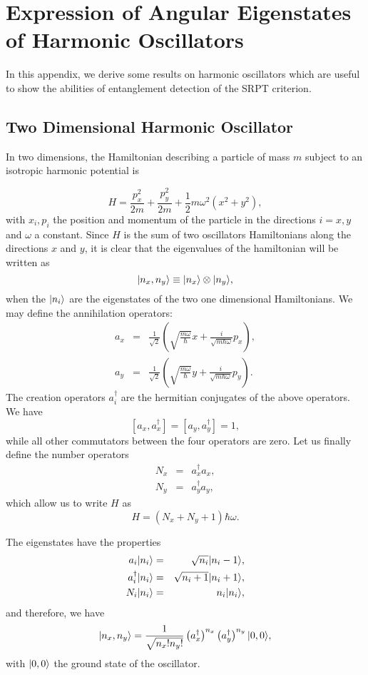 

\chapter{Expression of Angular Eigenstates of Harmonic Oscillators} \label{appA}

In this appendix, we derive some results on harmonic oscillators which are useful to show the abilities of entanglement detection of the SRPT criterion.

\section{Two Dimensional Harmonic Oscillator}

In two dimensions, the Hamiltonian describing a particle of mass $m$ subject to an isotropic harmonic potential is

\[ H =  \frac{p_x^2}{2m}+\frac{p_y^2}{2m} + \frac 1 2 m \omega^2 \left( x^2 + y^2 \right),\]
with $x_i, p_i$ the position and momentum of the particle in the directions $i=x,y$ and $\omega$ a constant. Since $H$ is the sum of two  oscillators Hamiltonians along the directions $x$ and $y$, it is clear that the eigenvalues of the hamiltonian will be written as
\[ | n_x, n_y \rangle \equiv | n_x \rangle \otimes | n_y \rangle, \]
when the $| n_i \rangle$ are the eigenstates of the two one dimensional Hamiltonians. We may define the annihilation operators:
\begin{eqnarray}
a_x &=& \frac{1}{\sqrt 2} \left( \sqrt{\frac{m\omega}{\hbar}} x + \frac{i}{\sqrt{m \hbar \omega}} p_x \right), \\ 
a_y &=& \frac{1}{\sqrt 2} \left( \sqrt{\frac{m\omega}{\hbar}} y +\frac{i}{\sqrt{m \hbar \omega}} p_y \right).
\end{eqnarray}
The creation operators $a^\dagger_i$ are the hermitian conjugates of the above operators. We have
\[ [a_x,a^\dagger_x]= [a_y,a^\dagger_y]=1, \]
while all other commutators between the four operators are zero. Let us finally define the number operators
\begin{eqnarray}
N_x &=&a_x^\dagger a_x, \\ 
N_y &=& a_y^\dagger a_y,
\end{eqnarray}
which allow us to write $H$ as
\[ H = (N_x + N_y +1) \hbar \omega. \]

The eigenstates have the properties
\begin{eqnarray}
a_i | n_i \rangle &=& \sqrt{n_i} | n_i-1 \rangle,\\
a_i^\dagger | n_i \rangle &=& \sqrt{n_i+1} | n_i+1 \rangle,\\
N_i | n_i \rangle &=& n_i | n_i \rangle,
\end{eqnarray}
and therefore, we have
\[  | n_x,n_y \rangle = \frac{1}{\sqrt{n_x! n_y!}} \left( a_x^\dagger \right)^{n_x}  \left( a_y^\dagger \right)^{n_y} | 0,0 \rangle, \]
with $| 0,0 \rangle$ the ground state of the oscillator.

